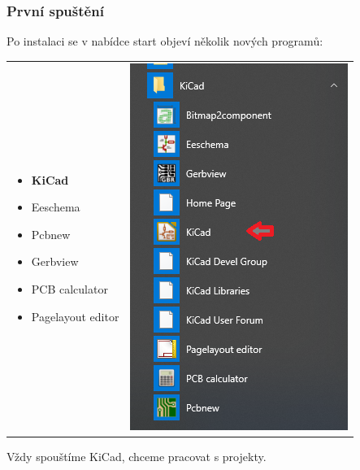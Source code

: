 \documentclass{beamer}
\begin{document}
	\begin{frame}
    \frametitle{První spuštění}
    \small
    	Po instalaci se v nabídce start objeví několik nových programů:
      \begin{tabular}{ m{6cm} m{2cm} }
         \begin{itemize}
           \item \textbf{KiCad}
           \item Eeschema
           \item Pcbnew
           \item Gerbview
           \item PCB calculator
           \item Pagelayout editor
         \end{itemize}
         & 
        \begin{minipage}{\textwidth}
          \includegraphics[scale=0.3]{obr/nabStart.png}
        \end{minipage}
				\vspace{0.2cm}
      \end{tabular} 
   
  Vždy spouštíme KiCad, chceme pracovat s projekty.
	\end{frame}
\end{document}

